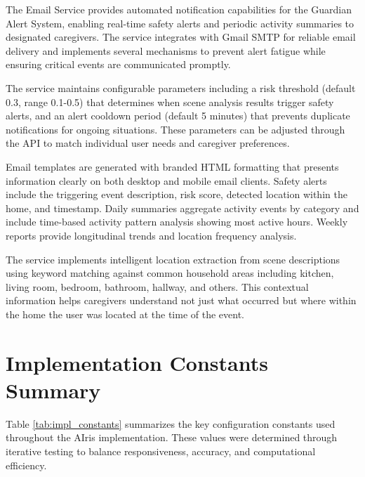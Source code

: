 \documentclass[12pt,a4paper]{report}
\begin{document}
The Email Service provides automated notification capabilities for the Guardian Alert System, enabling real-time safety alerts and periodic activity summaries to designated caregivers. The service integrates with Gmail SMTP for reliable email delivery and implements several mechanisms to prevent alert fatigue while ensuring critical events are communicated promptly.

The service maintains configurable parameters including a risk threshold (default 0.3, range 0.1-0.5) that determines when scene analysis results trigger safety alerts, and an alert cooldown period (default 5 minutes) that prevents duplicate notifications for ongoing situations. These parameters can be adjusted through the API to match individual user needs and caregiver preferences.

Email templates are generated with branded HTML formatting that presents information clearly on both desktop and mobile email clients. Safety alerts include the triggering event description, risk score, detected location within the home, and timestamp. Daily summaries aggregate activity events by category and include time-based activity pattern analysis showing most active hours. Weekly reports provide longitudinal trends and location frequency analysis.

The service implements intelligent location extraction from scene descriptions using keyword matching against common household areas including kitchen, living room, bedroom, bathroom, hallway, and others. This contextual information helps caregivers understand not just what occurred but where within the home the user was located at the time of the event.

\section{Implementation Constants Summary}

Table \ref{tab:impl_constants} summarizes the key configuration constants used throughout the AIris implementation. These values were determined through iterative testing to balance responsiveness, accuracy, and computational efficiency.
\end{document}
